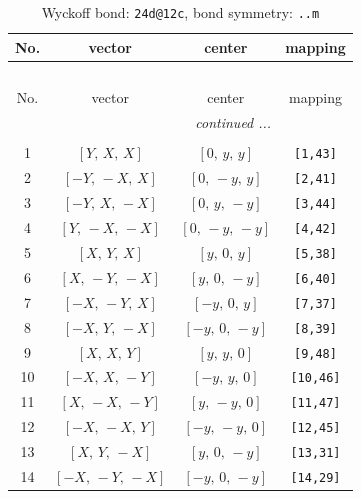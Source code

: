 \documentclass[fleqn,8pt]{jsarticle}
\begin{document}
\begin{longtable}{cccc}
\caption{Wyckoff bond: {\tt 24d@12c}, bond symmetry: {\tt ..m}}
 \\
 \hline \hline
No. & vector & center & mapping \\ \hline \endfirsthead

\multicolumn{3}{l}{\tablename\ \thetable{}} \\
 \hline \hline
No. & vector & center & mapping \\ \hline \endhead

 \hline \hline
\multicolumn{3}{r}{\footnotesize\it continued ...} \\ \endfoot

 \hline \hline
\multicolumn{3}{r}{} \\ \endlastfoot

1 & $\left[ Y,\, X,\, X \right]$ & $\left[ 0,\, y,\, y \right]$ & {\tt [1,43]} \\ \hline
2 & $\left[ - Y,\, - X,\, X \right]$ & $\left[ 0,\, - y,\, y \right]$ & {\tt [2,41]} \\ \hline
3 & $\left[ - Y,\, X,\, - X \right]$ & $\left[ 0,\, y,\, - y \right]$ & {\tt [3,44]} \\ \hline
4 & $\left[ Y,\, - X,\, - X \right]$ & $\left[ 0,\, - y,\, - y \right]$ & {\tt [4,42]} \\ \hline
5 & $\left[ X,\, Y,\, X \right]$ & $\left[ y,\, 0,\, y \right]$ & {\tt [5,38]} \\ \hline
6 & $\left[ X,\, - Y,\, - X \right]$ & $\left[ y,\, 0,\, - y \right]$ & {\tt [6,40]} \\ \hline
7 & $\left[ - X,\, - Y,\, X \right]$ & $\left[ - y,\, 0,\, y \right]$ & {\tt [7,37]} \\ \hline
8 & $\left[ - X,\, Y,\, - X \right]$ & $\left[ - y,\, 0,\, - y \right]$ & {\tt [8,39]} \\ \hline
9 & $\left[ X,\, X,\, Y \right]$ & $\left[ y,\, y,\, 0 \right]$ & {\tt [9,48]} \\ \hline
10 & $\left[ - X,\, X,\, - Y \right]$ & $\left[ - y,\, y,\, 0 \right]$ & {\tt [10,46]} \\ \hline
11 & $\left[ X,\, - X,\, - Y \right]$ & $\left[ y,\, - y,\, 0 \right]$ & {\tt [11,47]} \\ \hline
12 & $\left[ - X,\, - X,\, Y \right]$ & $\left[ - y,\, - y,\, 0 \right]$ & {\tt [12,45]} \\ \hline
13 & $\left[ X,\, Y,\, - X \right]$ & $\left[ y,\, 0,\, - y \right]$ & {\tt [13,31]} \\ \hline
14 & $\left[ - X,\, - Y,\, - X \right]$ & $\left[ - y,\, 0,\, - y \right]$ & {\tt [14,29]} \\ \hline

\end{longtable}
\end{document}
